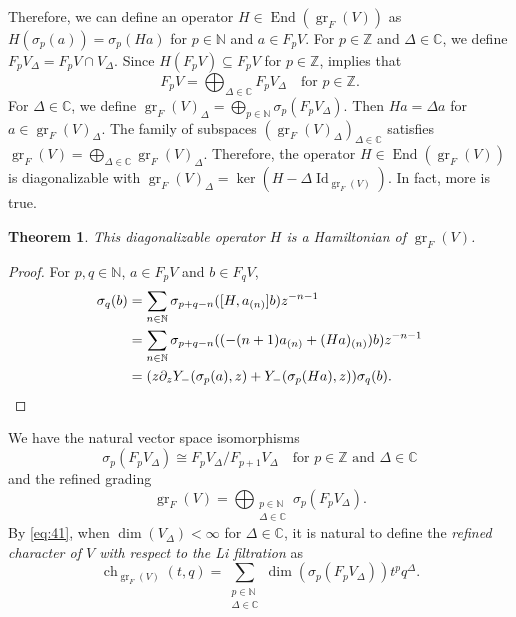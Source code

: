 \documentclass[a4paper, 12pt, reqno]{amsart}
\newtheorem{theorem}{Theorem}[section]
\theoremstyle{remark}
\DeclareMathOperator{\Id}{Id}
\DeclareMathOperator{\gr}{gr}
\DeclareMathOperator{\End}{End}
\DeclareMathOperator{\ch}{ch}
\begin{document}
Therefore, we can define an operator $H \in \End(\gr_F(V))$ as $H(\sigma_p(a)) = \sigma_p(Ha)$ for $p \in \mathbb{N}$ and $a \in F_pV$.
For $p \in \mathbb{Z}$ and $\Delta \in \mathbb{C}$, we define $F_pV_{\Delta} = F_pV \cap V_{\Delta}$.
Since $H(F_pV) \subseteq F_pV$ for $p \in \mathbb{Z}$,  implies that
\begin{equation*}
  F_pV = \bigoplus_{\Delta \in \mathbb{C}}F_pV_{\Delta} \quad \text{for $p \in \mathbb{Z}$}.
\end{equation*}
For $\Delta \in \mathbb{C}$, we define $\gr_F(V)_{\Delta} = \bigoplus_{p \in \mathbb{N}}\sigma_p(F_pV_{\Delta})$.
Then $Ha = \Delta a$ for $a \in \gr_F(V)_{\Delta}$.
The family of subspaces $(\gr_F(V)_{\Delta})_{\Delta \in \mathbb{C}}$ satisfies $\gr_F(V) = \bigoplus_{\Delta \in \mathbb{C}}\gr_F(V)_{\Delta}$.
Therefore, the operator $H \in \End(\gr_F(V))$ is diagonalizable with $\gr_F(V)_{\Delta} = \ker(H - \Delta\Id_{\gr_F(V)})$.
In fact, more is true.

\begin{theorem}
  \label{thr:47}
  This diagonalizable operator $H$ is a Hamiltonian of $\gr_F(V)$.
\end{theorem}

\begin{proof}
  For $p, q \in \mathbb{N}$, $a \in F_pV$ and $b \in F_qV$,
  \begin{align*}
    [H, Y_-(\sigma_p(a), z)]\sigma_q(b) &= \sum_{n \in \mathbb{N}}\sigma_{p + q - n}([H, a_{(n)}]b)z^{-n - 1} \\
                                        &= \sum_{n \in \mathbb{N}}\sigma_{p + q - n}((-(n + 1)a_{(n)} + (Ha)_{(n)})b)z^{-n - 1} \\
                                        &= (z\partial_zY_-(\sigma_p(a), z) + Y_-(\sigma_p(Ha), z))\sigma_q(b). \qedhere
  \end{align*}
\end{proof}

We have the natural vector space isomorphisms
\begin{equation*}
  \sigma_p(F_pV_{\Delta}) \cong F_pV_{\Delta}/F_{p + 1}V_{\Delta} \quad \text{for $p \in \mathbb{Z}$ and $\Delta \in \mathbb{C}$}
\end{equation*}
and the refined grading
\begin{equation}
  \label{eq:41}
  \gr_F(V) = \bigoplus_{\substack{p \in \mathbb{N} \\ \Delta \in \mathbb{C}}}\sigma_p(F_pV_{\Delta}).
\end{equation}
By \eqref{eq:41}, when $\dim(V_{\Delta}) < \infty$ for $\Delta \in \mathbb{C}$, it is natural to define the \emph{refined character of $V$ with respect to the Li filtration} as
\begin{equation*}
  \ch_{\gr_F(V)}(t, q) = \sum_{\substack{p \in \mathbb{N} \\ \Delta \in \mathbb{C}}}\dim(\sigma_p(F_pV_{\Delta}))t^pq^{\Delta}.
\end{equation*}
\end{document}
